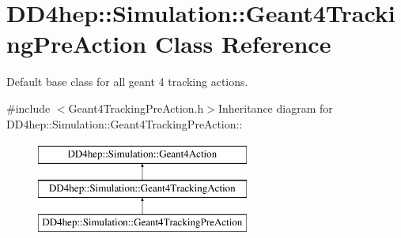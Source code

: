\hypertarget{class_d_d4hep_1_1_simulation_1_1_geant4_tracking_pre_action}{
\section{DD4hep::Simulation::Geant4TrackingPreAction Class Reference}
\label{class_d_d4hep_1_1_simulation_1_1_geant4_tracking_pre_action}
}


Default base class for all geant 4 tracking actions.  


{\ttfamily \#include $<$Geant4TrackingPreAction.h$>$}Inheritance diagram for DD4hep::Simulation::Geant4TrackingPreAction::\begin{figure}[H]
\begin{center}
\leavevmode
\includegraphics[height=3cm]{class_d_d4hep_1_1_simulation_1_1_geant4_tracking_pre_action}
\end{center}
\end{figure}
